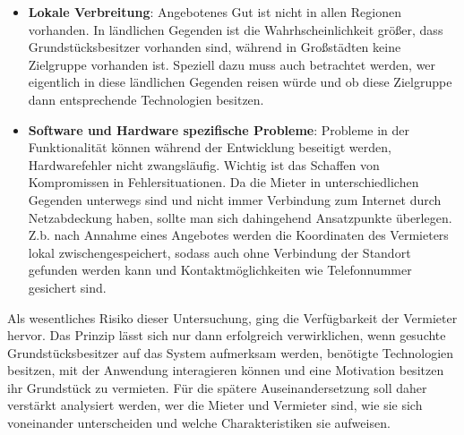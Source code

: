 \begin{itemize}
   \item
   \textbf{Lokale Verbreitung}: Angebotenes Gut ist nicht in allen Regionen vorhanden. In ländlichen Gegenden ist die Wahrhscheinlichkeit größer, dass Grundstücksbesitzer vorhanden sind, während in Großstädten keine Zielgruppe vorhanden ist. Speziell dazu muss auch betrachtet werden, wer eigentlich in diese ländlichen Gegenden reisen würde und ob diese Zielgruppe dann entsprechende Technologien besitzen.

   \item
   \textbf{Software und Hardware spezifische Probleme}:
   Probleme in der Funktionalität können während der Entwicklung beseitigt werden, Hardwarefehler nicht zwangsläufig. Wichtig ist das Schaffen von Kompromissen in Fehlersituationen. 
   Da die Mieter in unterschiedlichen Gegenden unterwegs sind und nicht immer Verbindung zum Internet durch Netzabdeckung haben, sollte man sich dahingehend Ansatzpunkte überlegen. Z.b. nach Annahme eines Angebotes werden die Koordinaten des Vermieters lokal zwischengespeichert, sodass auch ohne Verbindung der Standort gefunden werden kann und Kontaktmöglichkeiten wie Telefonnummer gesichert sind.    
\end{itemize}

Als wesentliches Risiko dieser Untersuchung, ging die Verfügbarkeit der Vermieter hervor. Das Prinzip lässt sich nur dann erfolgreich verwirklichen, wenn gesuchte Grundstücksbesitzer auf das System aufmerksam werden, benötigte Technologien besitzen, mit der Anwendung interagieren können und eine Motivation besitzen ihr Grundstück zu vermieten. Für die spätere Auseinandersetzung soll daher verstärkt analysiert werden, wer die Mieter und Vermieter sind, wie sie sich voneinander unterscheiden und welche Charakteristiken sie aufweisen.
 